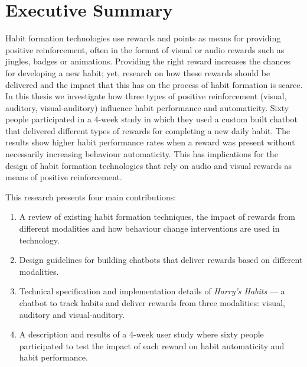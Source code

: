 
\section*{Executive Summary}
Habit formation technologies use rewards and points as means for providing positive reinforcement, often in the format of visual or audio rewards such as jingles, badges or animations. Providing the right reward increases the chances for developing a new habit; yet, research on how these rewards should be delivered and the impact that this has on the process of habit formation is scarce. In this thesis we investigate how three types of positive reinforcement (visual, auditory, visual-auditory) influence habit performance and automaticity. Sixty people participated in a 4-week study in which they used a custom built chatbot that delivered different types of rewards for completing a new daily habit. The results show higher habit performance rates when a reward was present without necessarily increasing behaviour automaticity. This has implications for the design of habit formation technologies that rely on audio and visual rewards as means of positive reinforcement.

This research presents four main contributions:

\begin{enumerate}
  \item A review of existing habit formation techniques, the impact of rewards from different modalities and how behaviour change interventions are used in technology.
  \item Design guidelines for building chatbots that deliver rewards based on different modalities.
  \item Technical specification and implementation details of \textit{Harry's Habits} --- a chatbot to track habits and deliver rewards from three modalities: visual, auditory and visual-auditory.
  \item A description and results of a 4-week user study where sixty people participated to test the impact of each reward on habit automaticity and habit performance.
\end{enumerate}

\newpage
